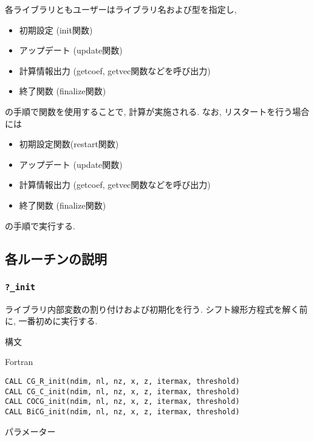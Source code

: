 \documentclass[12pt,titlepage]{jarticle}
\begin{document}
各ライブラリともユーザーはライブラリ名および型を指定し, 
\begin{itemize}
\item 初期設定 (init関数)
\item アップデート (update関数)
\item 計算情報出力 (getcoef, getvec関数などを呼び出力)
\item 終了関数 (finalize関数)
\end{itemize}
の手順で関数を使用することで, 計算が実施される. 
なお, リスタートを行う場合には
\begin{itemize}
\item 初期設定関数(restart関数)
\item アップデート (update関数)
\item 計算情報出力 (getcoef, getvec関数などを呼び出力)
\item 終了関数 (finalize関数)
\end{itemize}
の手順で実行する. 

\subsection{各ルーチンの説明}

\subsubsection{\texttt{?\_init}}

ライブラリ内部変数の割り付けおよび初期化を行う.
シフト線形方程式を解く前に, 一番初めに実行する.

\noindent 構文

\noindent Fortran
\begin{verbatim}
CALL CG_R_init(ndim, nl, nz, x, z, itermax, threshold)
CALL CG_C_init(ndim, nl, nz, x, z, itermax, threshold)
CALL COCG_init(ndim, nl, nz, x, z, itermax, threshold)
CALL BiCG_init(ndim, nl, nz, x, z, itermax, threshold)
\end{verbatim}

\noindent パラメーター
\end{document}
